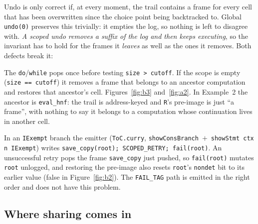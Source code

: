 \documentclass[11pt]{article}
\newcommand{\code}[1]{\texttt{#1}}
\begin{document}
Undo is only correct if, at every moment, the trail contains a frame for
every cell that has been overwritten since the choice point being backtracked
to. Global \code{undo(0)} preserves this trivially: it empties the log, so
nothing is left to disagree with. \emph{A scoped undo removes a suffix of the
log and then keeps executing}, so the invariant has to hold for the frames it
\emph{leaves} as well as the ones it removes. Both defects break it:

\begin{description}[leftmargin=1.5em, style=nextline]
\item[Defect 1: \code{undo} pops a frame outside its scope.]
  The \code{do}/\code{while} pops once before testing \code{size >
  cutoff}. If the scope is empty (\code{size == cutoff}) it removes a
  frame that belongs to an ancestor computation and restores that
  ancestor's cell. Figures~\ref{fig:b3} and~\ref{fig:a2}. In
  Example~2 the ancestor is \code{eval\_hnf}: the trail is address-keyed and
  \code{R}'s pre-image is just ``a frame'', with nothing to say it belongs to
  a computation whose continuation lives in another cell.
\item[Defect 2: a failed retry leaves \code{root} mutated without a frame.]
  In an \code{IExempt} branch the emitter (\code{ToC.curry},
  \code{showConsBranch}~$+$~\code{showStmt ctx n IExempt}) writes
  \code{save\_copy(root); SCOPED\_RETRY; fail(root)}. An unsuccessful retry
  pops the frame \code{save\_copy} just pushed, so \code{fail(root)}
  mutates \code{root} unlogged, and restoring the pre-image also resets
  \code{root}'s \code{nondet} bit to its earlier value (false in
  Figure~\ref{fig:b2}). The \code{FAIL\_TAG} path is
  emitted in the right order and does not have this problem.
\end{description}

\subsection{Where sharing comes in}
\end{document}
